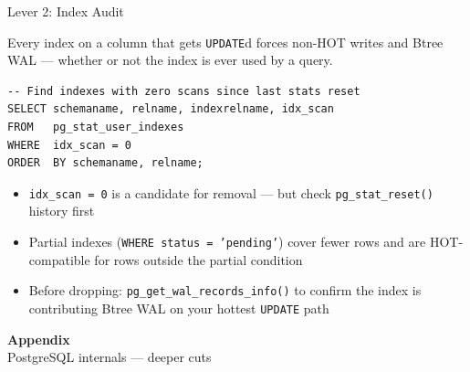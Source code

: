 \documentclass[aspectratio=169,10pt]{beamer}
\begin{document}
\begin{frame}[fragile]{Lever 2: Index Audit}

  Every index on a column that gets \texttt{UPDATE}d forces non-HOT writes
  and Btree WAL --- whether or not the index is ever used by a query.

  \vspace{0.6em}
\begin{lstlisting}[style=ascii]
-- Find indexes with zero scans since last stats reset
SELECT schemaname, relname, indexrelname, idx_scan
FROM   pg_stat_user_indexes
WHERE  idx_scan = 0
ORDER  BY schemaname, relname;
\end{lstlisting}

  \vspace{0.6em}
  \begin{itemize}
    \item \texttt{idx\_scan = 0} is a candidate for removal ---
          but check \texttt{pg\_stat\_reset()} history first
    \item Partial indexes (\texttt{WHERE status = 'pending'}) cover fewer rows
          and are HOT-compatible for rows outside the partial condition
    \item Before dropping: \texttt{pg\_get\_wal\_records\_info()} to confirm
          the index is contributing Btree WAL on your hottest \texttt{UPDATE} path
  \end{itemize}

\end{frame}

\appendix

\begin{frame}[standout]
  \begin{center}
    {\Large \textbf{Appendix}}\\[0.5em]
    {\normalsize PostgreSQL internals --- deeper cuts}
  \end{center}
\end{frame}
\end{document}
